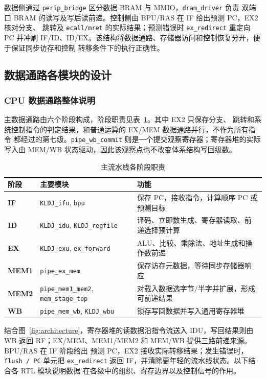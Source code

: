 \documentclass[UTF8,zihao=-4,a4paper]{ctexart}
\numberwithin{table}{section}
\numberwithin{figure}{section}
\newcommand{\code}[1]{\texttt{#1}}
\begin{document}
数据侧通过 \code{perip\_bridge} 区分数据 BRAM 与 MMIO，\code{dram\_driver} 负责
双端口 BRAM 的读写及写后读前递。控制侧由 BPU/RAS 在 IF 给出预测 PC，EX2 核对分支、
跳转及 \code{ecall/mret} 的实际结果；预测错误时 \code{ex\_redirect} 重定向 PC 并冲刷
IF/ID、ID/EX。该结构将数据通路、存储器访问和控制恢复分开，便于保证同步访存和控制
转移条件下的执行正确性。

\subsection{数据通路各模块的设计}

\subsubsection{CPU 数据通路整体说明}

主数据通路由六个阶段构成，阶段职责见表~\ref{tab:pipeline}。其中 EX2 只保存分支、
跳转和系统控制指令的判定结果，和普通运算的 EX/MEM 数据通路并行，不作为所有指令
都经过的第七级。\code{pipe\_wb\_commit} 则是一个提交观察寄存器；寄存器堆的实际
写入由 MEM/WB 状态驱动，因此该观察点也不改变体系结构写回级数。

\begin{table}[H]
  \centering
  \caption{主流水线各阶段职责}
  \label{tab:pipeline}
  \begin{tabularx}{\textwidth}{>{\bfseries}p{1.7cm}p{3.3cm}X}
    \toprule
    阶段 & 主要模块 & 功能 \\
    \midrule
    IF & \code{KLDJ\_ifu}, \code{bpu} & 保存 PC，接收指令，计算顺序 PC 或预测目标 \\
    ID & \code{KLDJ\_idu}, \code{KLDJ\_regfile} & 译码、立即数生成、寄存器读取、前递选择预计算 \\
    EX & \code{KLDJ\_exu}, \code{ex\_forward} & ALU、比较、乘除法、地址生成和操作数前递 \\
    MEM1 & \code{pipe\_ex\_mem} & 保存访存元数据，等待同步存储器响应 \\
    MEM2 & \code{pipe\_mem1\_mem2}, \code{mem\_stage\_top} & 对载入数据选字节/半字并扩展，形成可前递结果 \\
    WB & \code{pipe\_mem\_wb}, \code{KLDJ\_wbu} & 锁存写回数据并写入通用寄存器堆 \\
    \bottomrule
  \end{tabularx}
\end{table}

结合图~\ref{fig:architecture}，寄存器堆的读数据沿指令流送入 IDU，写回结果则由 WB
返回 RF；EX/MEM、MEM1/MEM2 和 MEM/WB 提供三路前递来源。BPU/RAS 在 IF 阶段给出
预测 PC，EX2 接收实际转移结果；发生错误时，\code{flush / PC} 单元把
\code{ex\_redirect} 返回 IF，并清除更年轻的流水线状态。以下结合各 RTL 模块说明数据
在各级中的组织、寄存边界以及控制信号的作用。
\end{document}
